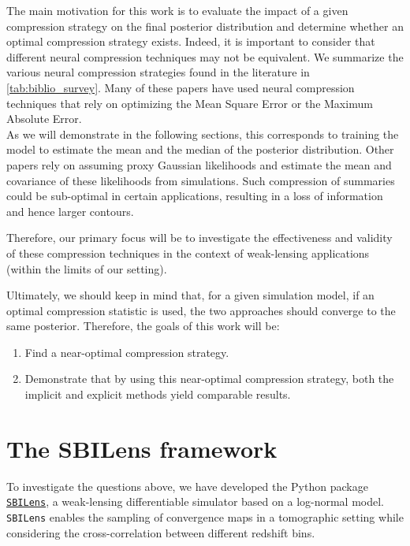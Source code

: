 \documentclass{aa}
\begin{document}
The main motivation for this work is to evaluate the impact of a given compression strategy on the final posterior distribution and determine whether an optimal compression strategy exists. Indeed, it is important to consider that different neural compression techniques may not be equivalent. We summarize the various neural compression strategies found in the literature in \autoref{tab:biblio_survey}. 
Many of these papers have used neural compression techniques that rely on optimizing the Mean Square Error or the Maximum Absolute Error. \\
As we will demonstrate in the following sections, this corresponds to training the model to estimate the mean and the median of the posterior distribution. Other papers rely on assuming proxy Gaussian likelihoods and estimate the mean and covariance of these likelihoods from simulations.
Such compression of summaries could be sub-optimal in certain applications, resulting in a loss of information and hence larger contours. 

Therefore, our primary focus will be to investigate the effectiveness and validity of these compression techniques in the context of weak-lensing applications (within the limits of our setting).

\vspace{1cm}
Ultimately, we should keep in mind that, for a given simulation model, if an optimal compression statistic is used, the two approaches should converge to the same posterior. Therefore, the goals of this work will be:
\begin{enumerate}
    \item Find a near-optimal compression strategy.
    \item Demonstrate that by using this near-optimal compression strategy, both the implicit and explicit methods yield comparable results.
\end{enumerate}


\section{The SBILens framework}\label{Sec:the SBILens framework}
To investigate the questions above, we have developed the Python package \href{https://github.com/DifferentiableUniverseInitiative/sbi_lens}{\texttt{SBILens}}, a weak-lensing differentiable simulator based on a log-normal model. \texttt{SBILens} enables the sampling of convergence maps in a tomographic setting while considering the cross-correlation between different redshift bins.
\end{document}
